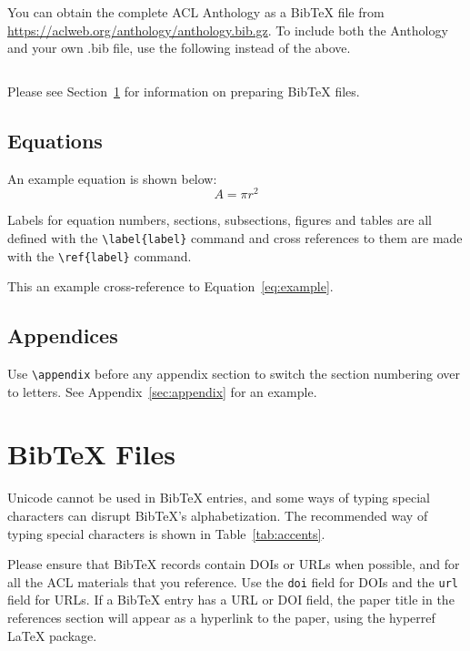 \documentclass[11pt]{article}
\begin{document}
You can obtain the complete ACL Anthology as a Bib\TeX{} file from \url{https://aclweb.org/anthology/anthology.bib.gz}.
To include both the Anthology and your own .bib file, use the following instead of the above.
\begin{quote}
\begin{verbatim}

\end{verbatim}
\end{quote}

Please see Section~\ref{sec:bibtex} for information on preparing Bib\TeX{} files.

\subsection{Equations}

An example equation is shown below:
\begin{equation}
  \label{eq:example}
  A = \pi r^2
\end{equation}

Labels for equation numbers, sections, subsections, figures and tables
are all defined with the \verb|\label{label}| command and cross references
to them are made with the \verb|\ref{label}| command.

This an example cross-reference to Equation~\ref{eq:example}.

\subsection{Appendices}

Use \verb|\appendix| before any appendix section to switch the section numbering over to letters. See Appendix~\ref{sec:appendix} for an example.

\section{Bib\TeX{} Files}
\label{sec:bibtex}

Unicode cannot be used in Bib\TeX{} entries, and some ways of typing special characters can disrupt Bib\TeX's alphabetization. The recommended way of typing special characters is shown in Table~\ref{tab:accents}.

Please ensure that Bib\TeX{} records contain DOIs or URLs when possible, and for all the ACL materials that you reference.
Use the \verb|doi| field for DOIs and the \verb|url| field for URLs.
If a Bib\TeX{} entry has a URL or DOI field, the paper title in the references section will appear as a hyperlink to the paper, using the hyperref \LaTeX{} package.
\end{document}
